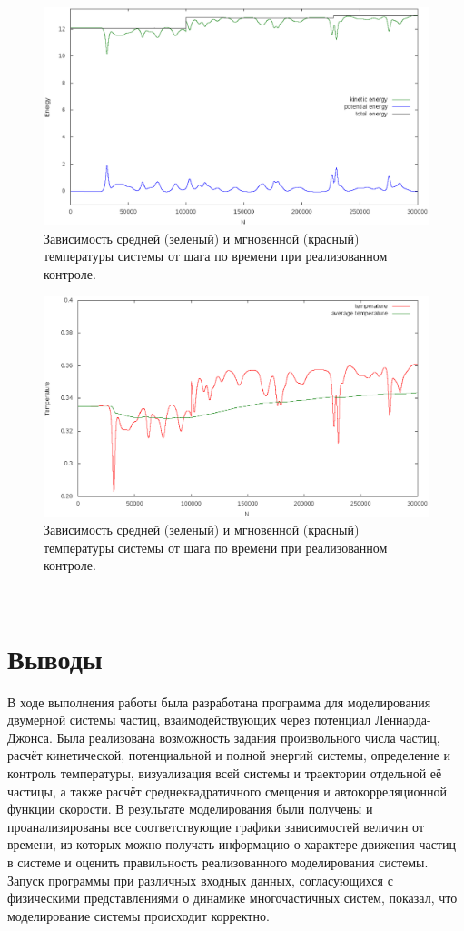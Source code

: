 \documentclass[14pt,a4paper,report]{ncc}
\begin{document}
\begin{figure}[!h]
\includegraphics[scale=0.6]{energy300}
\caption{Зависимость средней (зеленый) и мгновенной (красный) температуры системы от шага по времени при реализованном контроле.}
\end{figure}
\begin{figure}[!h]
\includegraphics[scale=0.6]{temp300}
\caption{Зависимость средней (зеленый) и мгновенной (красный) температуры системы от шага по времени при реализованном контроле.}
\end{figure}
\

\newpage\section{Выводы}
В ходе выполнения работы была разработана программа для моделирования двумерной системы частиц, взаимодействующих через потенциал Леннарда-Джонса. Была реализована возможность задания произвольного числа частиц, расчёт кинетической, потенциальной и полной энергий системы, определение и контроль температуры, визуализация всей системы и траектории отдельной её частицы, а также расчёт среднеквадратичного смещения и автокорреляционной функции скорости. В результате моделирования были получены и проанализированы все соответствующие графики зависимостей величин от времени, из которых можно получать информацию о характере движения частиц в системе и оценить правильность реализованного моделирования системы. Запуск программы при различных входных данных, согласующихся с физическими представлениями о динамике многочастичных систем, показал, что моделирование системы происходит корректно.
\end{document}
